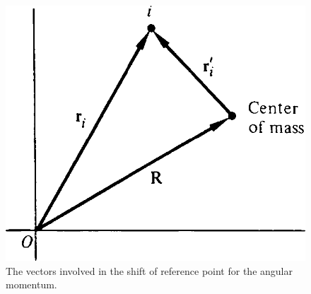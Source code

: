 \begin{figure}[htbp]
    \centering
    \includegraphics[scale = 0.225]{01/figures/1.3}
    \caption{The vectors involved in the shift of reference point for the angular momentum.}
    \label{fig:1.3}
\end{figure}

